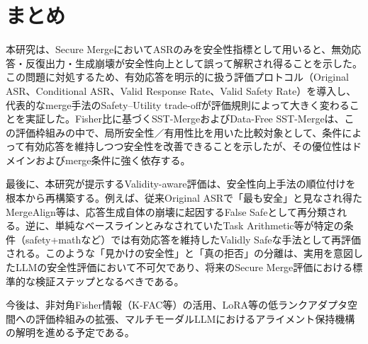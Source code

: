 \documentclass{article}
\begin{document}
\section{まとめ}
本研究は、Secure MergeにおいてASRのみを安全性指標として用いると、無効応答・反復出力・生成崩壊が安全性向上として誤って解釈され得ることを示した。この問題に対処するため、有効応答を明示的に扱う評価プロトコル（Original ASR、Conditional ASR、Valid Response Rate、Valid Safety Rate）を導入し、代表的なmerge手法のSafety–Utility trade-offが評価規則によって大きく変わることを実証した。Fisher比に基づくSST-MergeおよびData-Free SST-Mergeは、この評価枠組みの中で、局所安全性／有用性比を用いた比較対象として、条件によって有効応答を維持しつつ安全性を改善できることを示したが、その優位性はドメインおよびmerge条件に強く依存する。

最後に、本研究が提示するValidity-aware評価は、安全性向上手法の順位付けを根本から再構築する。例えば、従来Original ASRで「最も安全」と見なされ得たMergeAlign等は、応答生成自体の崩壊に起因するFalse Safeとして再分類される。逆に、単純なベースラインとみなされていたTask Arithmetic等が特定の条件（safety+mathなど）では有効応答を維持したValidly Safeな手法として再評価される。このような「見かけの安全性」と「真の拒否」の分離は、実用を意図したLLMの安全性評価において不可欠であり、将来のSecure Merge評価における標準的な検証ステップとなるべきである。

今後は、非対角Fisher情報（K-FAC等）の活用、LoRA等の低ランクアダプタ空間への評価枠組みの拡張、マルチモーダルLLMにおけるアライメント保持機構の解明を進める予定である。


\end{document}
